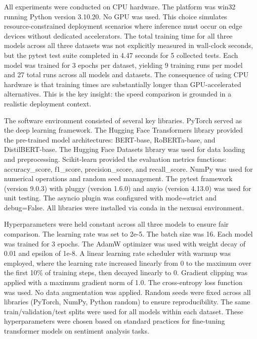 \documentclass[conference]{IEEEtran}
\begin{document}
\begin{table}[h]
\centering
\caption{Dataset Configuration}
\label{tab:dataset_config}
\end{table}

All experiments were conducted on CPU hardware. The platform was win32 running Python version 3.10.20. No GPU was used. This choice simulates resource-constrained deployment scenarios where inference must occur on edge devices without dedicated accelerators. The total training time for all three models across all three datasets was not explicitly measured in wall-clock seconds, but the pytest test suite completed in 4.47 seconds for 5 collected tests. Each model was trained for 3 epochs per dataset, yielding 9 training runs per model and 27 total runs across all models and datasets. The consequence of using CPU hardware is that training times are substantially longer than GPU-accelerated alternatives. This is the key insight: the speed comparison is grounded in a realistic deployment context.

The software environment consisted of several key libraries. PyTorch served as the deep learning framework. The Hugging Face Transformers library provided the pre-trained model architectures: BERT-base, RoBERTa-base, and DistilBERT-base. The Hugging Face Datasets library was used for data loading and preprocessing. Scikit-learn provided the evaluation metrics functions: accuracy\_score, f1\_score, precision\_score, and recall\_score. NumPy was used for numerical operations and random seed management. The pytest framework (version 9.0.3) with pluggy (version 1.6.0) and anyio (version 4.13.0) was used for unit testing. The asyncio plugin was configured with mode=strict and debug=False. All libraries were installed via conda in the nexusai environment.

Hyperparameters were held constant across all three models to ensure fair comparison. The learning rate was set to 2e-5. The batch size was 16. Each model was trained for 3 epochs. The AdamW optimizer was used with weight decay of 0.01 and epsilon of 1e-8. A linear learning rate scheduler with warmup was employed, where the learning rate increased linearly from 0 to the maximum over the first 10\% of training steps, then decayed linearly to 0. Gradient clipping was applied with a maximum gradient norm of 1.0. The cross-entropy loss function was used. No data augmentation was applied. Random seeds were fixed across all libraries (PyTorch, NumPy, Python random) to ensure reproducibility. The same train/validation/test splits were used for all models within each dataset. These hyperparameters were chosen based on standard practices for fine-tuning transformer models on sentiment analysis tasks.
\end{document}
